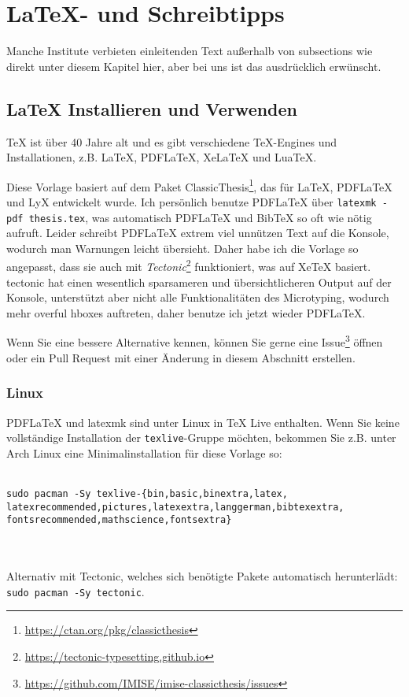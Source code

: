 \chapter{\LaTeX{}- und Schreibtipps}
Manche Institute verbieten einleitenden Text außerhalb von subsections wie direkt unter diesem Kapitel hier, aber bei uns ist das ausdrücklich erwünscht.

\section{\LaTeX{} Installieren und Verwenden}
\TeX{} ist über 40 Jahre alt und es gibt verschiedene \TeX{}-Engines und Installationen\footnotemark{}, z.B. \LaTeX{}, PDF\LaTeX{}, Xe\LaTeX{} und Lua\TeX{}.

Diese Vorlage basiert auf dem Paket ClassicThesis\footnote{\url{https://ctan.org/pkg/classicthesis}}, das für \LaTeX{}, PDF\LaTeX{} und LyX entwickelt wurde.
Ich persönlich benutze PDF\LaTeX{} über \texttt{latexmk -pdf thesis.tex}, was automatisch PDF\LaTeX{} und Bib\TeX{} so oft wie nötig aufruft.
Leider schreibt PDF\LaTeX{} extrem viel unnützen Text auf die Konsole, wodurch man Warnungen leicht übersieht.
Daher habe ich die Vorlage so angepasst, dass sie auch mit \emph{Tectonic}\footnote{\url{https://tectonic-typesetting.github.io}} funktioniert, was auf Xe\TeX{} basiert.
tectonic hat einen wesentlich sparsameren und übersichtlicheren Output auf der Konsole, unterstützt aber nicht alle Funktionalitäten des Microtyping, wodurch mehr overful hboxes auftreten, daher benutze ich jetzt wieder PDF\LaTeX{}.

Wenn Sie eine bessere Alternative kennen, können Sie gerne eine Issue\footnote{\url{https://github.com/IMISE/imise-classicthesis/issues}} öffnen oder ein Pull Request mit einer Änderung in diesem Abschnitt erstellen.

\subsection{Linux}

PDF\LaTeX{} und latexmk sind unter Linux in \TeX{} Live enthalten.
Wenn Sie keine vollständige Installation der \texttt{texlive}-Gruppe möchten, bekommen Sie z.B. unter Arch Linux eine Minimalinstallation für diese Vorlage so:\\
~\\
{\raggedright\texttt{sudo pacman -Sy texlive-\{bin,basic,binextra,latex,\\%
latexrecommended,pictures,latexextra,langgerman,bibtexextra,\\%
fontsrecommended,mathscience,fontsextra\}}}
~\\
~\\
Alternativ mit Tectonic, welches sich benötigte Pakete automatisch herunterlädt: \texttt{sudo pacman -Sy tectonic}.

